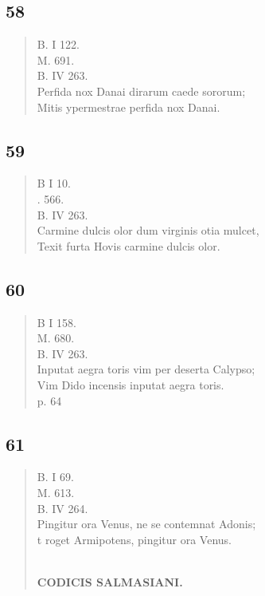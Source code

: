 \documentclass[11pt, a4paper]{report}
\begin{document}
            \subsection*{58}
      \begin{verse}
      B. I 122. \\ M. 691. \\ B. IV 263. \\ Perfida nox Danai dirarum caede sororum; \\ Mitis ypermestrae perfida nox Danai. \\ 
      \end{verse}
  
            \subsection*{59}
      \begin{verse}
      B I 10. \\ . 566. \\ B. IV 263. \\ Carmine dulcis olor dum virginis otia mulcet, \\ Texit furta Hovis carmine dulcis olor. \\ 
      \end{verse}
  
            \subsection*{60}
      \begin{verse}
      B I 158. \\ M. 680. \\ B. IV 263. \\ Inputat aegra toris vim per deserta Calypso; \\ Vim Dido incensis inputat aegra toris. \\ p. 64 \\ 
      \end{verse}
  
            \subsection*{61}
      \begin{verse}
      B. I 69. \\ M. 613. \\ B. IV 264. \\ Pingitur ora Venus, ne se contemnat Adonis; \\ t roget Armipotens, pingitur ora Venus. \\ 
        ﻿\pagebreak 
    \begin{center} \textbf{CODICIS SALMASIANI.} \end{center} \marginpar{[107]} 
      \end{verse}
  
\end{document}
